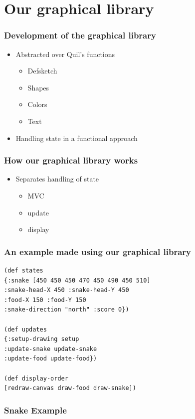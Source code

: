 \documentclass{beamer}
\newcommand{\comment}[1]{{\bf \tt  {#1}}}
\newcommand{\todo}[1]{\textcolor{blue}{\comment{To Do: {#1}}}}
\begin{document}
\section{Our graphical library}

\begin{frame}
\frametitle{Development of the graphical library}
\begin{itemize}
\item Abstracted over Quil's functions
	\begin{itemize}
	\item Defsketch
	\item Shapes
	\item Colors
	\item Text
	\end{itemize}
\item Handling state in a functional approach
\end{itemize}
\end{frame}


\begin{frame}
\frametitle{How our graphical library works}
\begin{itemize}
\item Separates handling of state
	\begin{itemize}
	\item MVC
	\item update
	\item display
	\end{itemize}
\end{itemize}
\end{frame}

\begin{frame} [fragile]
\frametitle{An example made using our graphical library}
\begin{verbatim}
(def states
{:snake [450 450 450 470 450 490 450 510] 
:snake-head-X 450 :snake-head-Y 450 
:food-X 150 :food-Y 150 
:snake-direction "north" :score 0})

(def updates
{:setup-drawing setup 
:update-snake update-snake
:update-food update-food})

(def display-order
[redraw-canvas draw-food draw-snake])
\end{verbatim}
\end{frame}

\begin{frame}
\frametitle{Snake Example}
\begin{center}
\end{center}
\end{frame}
\end{document}
